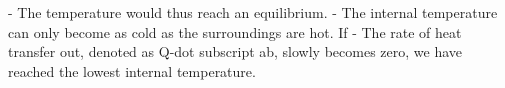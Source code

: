 - The temperature would thus reach an equilibrium.
- The internal temperature can only become as cold as the surroundings are hot. If
- The rate of heat transfer out, denoted as Q-dot subscript ab, slowly becomes zero, we have reached the lowest internal temperature.